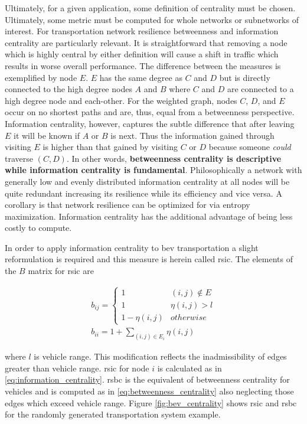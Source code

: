 Ultimately, for a given application, some definition of centrality must be chosen. Ultimately, some metric must be computed for whole networks or subnetworks of interest. For transportation network resilience betweenness and information centrality are particularly relevant. It is straightforward that removing a node which is highly central by either definition will cause a shift in traffic which results in worse overall performance. The difference between the measures is exemplified by node $E$. $E$ has the same degree as $C$ and $D$ but is directly connected to the high degree nodes $A$ and $B$ where $C$ and $D$ are connected to a high degree node and each-other. For the weighted graph, nodes $C$, $D$, and $E$ occur on no shortest paths and are, thus, equal from a betweenness perspective. Information centrality, however, captures the subtle difference that after leaving $E$ it will be known if $A$ or $B$ is next. Thus the information gained through visiting $E$ is higher than that gained by visiting $C$ or $D$ because someone \textit{could} traverse $(C, D)$. In other words, \textbf{betweenness centrality is descriptive while information centrality is fundamental}. Philosophically a network with generally low and evenly distributed information centrality at all nodes will be quite redundant increasing its resilience while its efficiency and vice versa. A corollary is that network resilience can be optimized for via entropy maximization. Information centrality has the additional advantage of being less costly to compute.

In order to apply information centrality to \gls{bev} transportation a slight reformulation is required and this measure is herein called \gls{rsic}. The elements of the $B$ matrix for \gls{rsic} are

\begin{align}
	b_{ij} = \begin{cases}
		1 & (i, j) \not\in E \\
		1 & \eta(i, j)>l \\
		1 - \eta(i, j) & otherwise
	\end{cases}\\
	b_{ii} = 1 + \sum_{(i, j) \in E_i} \eta(i, j)
\end{align}

where $l$ is vehicle range. This modification reflects the inadmissibility of edges greater than vehicle range. \gls{rsic} for node $i$ is calculated as in \eqref{eq:information_centrality}. \gls{rsbc} is the equivalent of betweenness centrality for vehicles and is computed as in \eqref{eq:betweenness_centrality} also neglecting those edges which exceed vehicle range. Figure \ref{fig:bev_centrality} shows \gls{rsic} and \gls{rsbc} for the randomly generated transportation system example.

